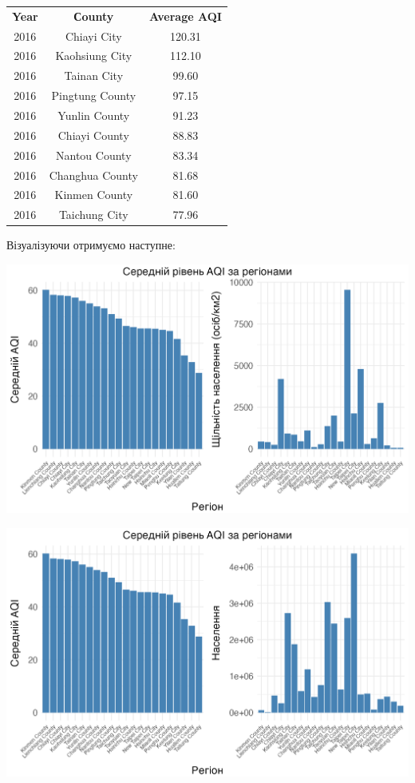\documentclass[./report.tex]{subfiles}
\begin{document}
\begin{enumerate}
  \begin{tabular}{ccc}
    \textbf{Year} & \textbf{Сounty} & \textbf{Average AQI} \\
    2016 & Chiayi City     & 120.31 \\
    2016 & Kaohsiung City  & 112.10 \\
    2016 & Tainan City     & 99.60  \\
    2016 & Pingtung County & 97.15  \\
    2016 & Yunlin County   & 91.23  \\
    2016 & Chiayi County   & 88.83  \\
    2016 & Nantou County   & 83.34  \\
    2016 & Changhua County & 81.68  \\
    2016 & Kinmen County   & 81.60  \\
    2016 & Taichung City   & 77.96  \\
  \end{tabular}

  Візуалізуючи отримуємо наступне:

  \includegraphics[width=\linewidth]{plots/question4/avg_aqi_by_county_w_dens.png}

  \includegraphics[width=\linewidth]{plots/question4/avg_aqi_by_county_w_pop.png}


\end{enumerate}
\end{document}
